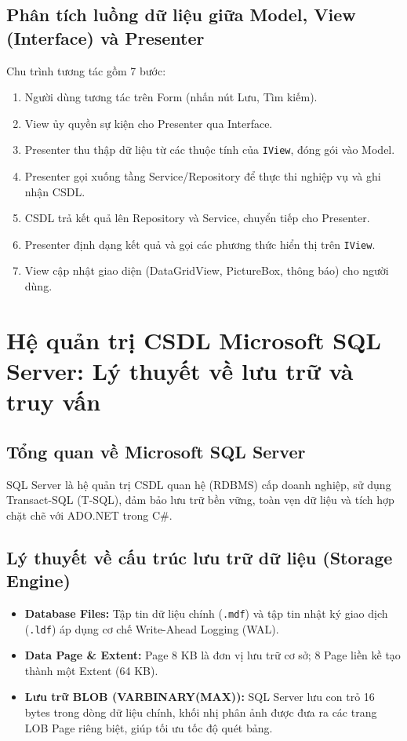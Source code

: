 \documentclass[12pt,a4paper]{report}
\begin{document}
\subsection{Phân tích luồng dữ liệu giữa Model, View (Interface) và Presenter}
Chu trình tương tác gồm 7 bước:
\begin{enumerate}[leftmargin=1.0cm]
    \item Người dùng tương tác trên Form (nhấn nút Lưu, Tìm kiếm).
    \item View ủy quyền sự kiện cho Presenter qua Interface.
    \item Presenter thu thập dữ liệu từ các thuộc tính của \texttt{IView}, đóng gói vào Model.
    \item Presenter gọi xuống tầng Service/Repository để thực thi nghiệp vụ và ghi nhận CSDL.
    \item CSDL trả kết quả lên Repository và Service, chuyển tiếp cho Presenter.
    \item Presenter định dạng kết quả và gọi các phương thức hiển thị trên \texttt{IView}.
    \item View cập nhật giao diện (DataGridView, PictureBox, thông báo) cho người dùng.
\end{enumerate}

\section{Hệ quản trị CSDL Microsoft SQL Server: Lý thuyết về lưu trữ và truy vấn}

\subsection{Tổng quan về Microsoft SQL Server}
SQL Server là hệ quản trị CSDL quan hệ (RDBMS) cấp doanh nghiệp, sử dụng Transact-SQL (T-SQL), đảm bảo lưu trữ bền vững, toàn vẹn dữ liệu và tích hợp chặt chẽ với ADO.NET trong C\#.

\subsection{Lý thuyết về cấu trúc lưu trữ dữ liệu (Storage Engine)}
\begin{itemize}[leftmargin=1.0cm]
    \item \textbf{Database Files:} Tập tin dữ liệu chính (\texttt{.mdf}) và tập tin nhật ký giao dịch (\texttt{.ldf}) áp dụng cơ chế Write-Ahead Logging (WAL).
    \item \textbf{Data Page \& Extent:} Page 8 KB là đơn vị lưu trữ cơ sở; 8 Page liền kề tạo thành một Extent (64 KB).
    \item \textbf{Lưu trữ BLOB (VARBINARY(MAX)):} SQL Server lưu con trỏ 16 bytes trong dòng dữ liệu chính, khối nhị phân ảnh được đưa ra các trang LOB Page riêng biệt, giúp tối ưu tốc độ quét bảng.
\end{itemize}
\end{document}
